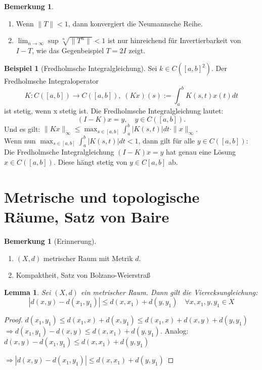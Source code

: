 \documentclass[ngerman]{report}
\theoremstyle{plain}%
\newtheorem{lemma}[thm]{Lemma}
\theoremstyle{definition}%
\newtheorem{bsp}[thm]{Beispiel}
\theoremstyle{myStyle}
\newtheorem{bem}[thm]{Bemerkung}
\newcommand{\norm}[1]{\|#1\|}
\newcommand{\df}[1][]{%
	\overset{#1}{\Rightarrow}
}
\newcommand{\limes}[1][\infty]{\lim_{n \to #1}}
\newcommand{\disp}{\displaystyle}
\begin{document}
	\begin{bem}
		\begin{enumerate}
			\item Wenn $\norm{T} < 1$, dann konvergiert die Neumannsche Reihe.
			\item $\disp \limes\sup\sqrt[n]{\norm{T^n}} <1$ ist nur hinreichend für Invertierbarkeit von $I-T$, wie das Gegenbeispiel $T = 2I$ zeigt.
		\end{enumerate}
	\end{bem}
	\begin{bsp}[Fredholmsche Integralgleichung]
		Sei $k\in C([a,b]^2)$.
		Der Fredholmsche Integraloperator $$K:C([a,b])\to C([a,b]),\; (Kx)(s):=\int^b_a K(s,t)x(t)dt$$ ist stetig, wenn x stetig ist.
		Die Fredholmsche Integralgleichung lautet: $$(I-K)x=y,\quad y\in C([a,b]).$$
		Und es gilt: $\displaystyle \|Kx\|_\infty \leq \max_{s\in[a,b]} \int^b_a |K(s,t)|dt\cdot\|x\|_\infty$.\\
		Wenn nun $\displaystyle \max_{s\in[a,b]} \int^b_a |K(s,t)|dt<1$, dann gilt für alle $ y\in C([a,b]):$
		Die Fredholmsche Integralgleichung $(I-K)x=y$ hat genau eine Lösung $x\in C([a,b])$. Diese hängt stetig von $y\in C[a,b]$ ab.
	\end{bsp}

\section{Metrische und topologische Räume, Satz von Baire}
	\begin{bem}[Erinnerung]
		\begin{enumerate}[-]
			\item $(X,d)$ metrischer Raum mit Metrik $d$.
			
			\item Kompaktheit, Satz von Bolzano-Weierstraß
		\end{enumerate}
	\end{bem}

	\begin{lemma}
		Sei $(X,d)$ ein metrischer Raum. Dann gilt die Vierecksungleichung:
		$$|d(x,y)-d(x_1,y_1)| \leq d(x,x_1) +d(y,y_1)\quad \forall x,x_1,y,y_1\in X$$
	\end{lemma}
	\begin{proof}
		$d(x_1,y_1) \leq d(x_1,x)+d(x,y_1) \leq d(x_1,x)+d(x,y)+d(y,y_1)$\\$\df d(x_1,y_1)-		d(x,y) \leq d(x,x_1)+d(y,y_1)$. Analog: $d(x,y)-d(x_1,y_1) \leq d(x,x_1)+d(y,y_1)$\par
		$\df |d(x,y) - d(x_1,y_1)| \leq d(x,x_1) +d(y,y_1)$
	\end{proof}
\end{document}
